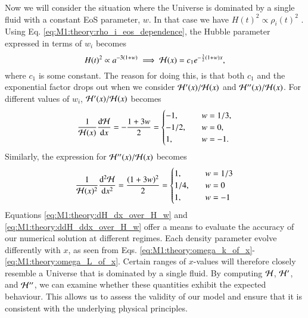 Now we will consider the situation where the Universe is dominated by a single fluid with a constant EoS parameter, $w$. In that case we have $H(t)^2 \propto \rho_i(t)^2$ \cite[Eq. (3.13)]{Dodelson}. Using Eq. \eqref{eq:M1:theory:rho_i_eos_dependence}, the Hubble parameter expressed in terms of $w_i$ becomes  
\begin{equation}
    H(t)^2 \propto a^{-3(1+w)}\implies \mathcal{H}(x) = c_1 e^{-\frac{3}{2}(1+w)x}, \label{eq:M1:theory:Hx_eos_wi}
\end{equation}
where $c_1$ is some constant. The reason for doing this, is that both $c_1$ and the exponential factor drops out when we consider $\mathcal{H}'(x)/\mathcal{H}(x)$ and $\mathcal{H}''(x)/\mathcal{H}(x)$. For different values of $w_i$, $\mathcal{H}'(x)/\mathcal{H}(x)$ becomes    
\begin{equation} \label{eq:M1:theory:dH_dx_over_H_w}
    \frac{1}{\mathcal{H}(x)}\dv{\mathcal{H}}{x} = - \frac{1+3w}{2} = 
    \begin{cases}
        -1,\quad & w=1/3, \\ 
        -1/2, \quad & w=0, \\ 
        1, \quad & w=-1.
    \end{cases} 
\end{equation}  
%
Similarly, the expression for $\mathcal{H}''(x)/\mathcal{H}(x)$ becomes  
\begin{equation} \label{eq:M1:theory:ddH_ddx_over_H_w}
    \frac{1}{\mathcal{H}(x)^2}\dv[2]{\mathcal{H}}{x} = \frac{(1+3w)^2}{2} = 
    \begin{cases}
        1,\quad & w=1/3 \\ 
        1/4,\quad & w=0 \\ 
        1,\quad & w=-1 
    \end{cases}
\end{equation}
%  
Equations \eqref{eq:M1:theory:dH_dx_over_H_w} and \eqref{eq:M1:theory:ddH_ddx_over_H_w} offer a means to evaluate the accuracy of our numerical solution at different regimes. Each density parameter evolve differently with $x$, as seen from Eqs. \eqref{eq:M1:theory:omega_k_of_x}-\eqref{eq:M1:theory:omega_L_of_x}. Certain ranges of $x$-values will therefore closely resemble a Universe that is dominated by a single fluid. By computing $\mathcal{H}$, $\mathcal{H}'$, and $\mathcal{H}''$, we can examine whether these quantities exhibit the expected behaviour. This allows us to assess the validity of our model and ensure that it is consistent with the underlying physical principles.